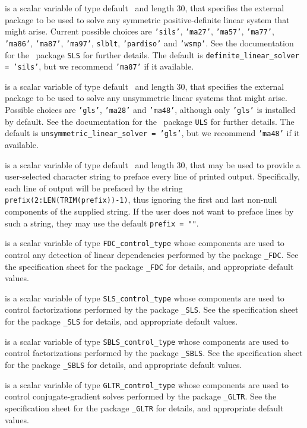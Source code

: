 \begin{description}
 is a scalar variable of type default \character\
and length 30, that specifies the external package to be used to
solve any symmetric positive-definite linear system that might arise.
Current possible
choices are {\tt 'sils'}, {\tt 'ma27'}, {\tt 'ma57'}, {\tt 'ma77'},
{\tt 'ma86'}, {\tt 'ma87'}, {\tt 'ma97'}, {\tt slblt}, {\tt 'pardiso'}
and {\tt 'wsmp'}.
See the documentation for the \galahad\ package {\tt SLS} for further details.
The default is {\tt definite\_linear\_solver = 'sils'},
but we recommend {\tt 'ma87'} if it available.

 is a scalar variable of type default
\character\
and length 30, that specifies the external package to be used to
solve any unsymmetric linear systems that might arise. Possible
choices are
{\tt 'gls'},
{\tt 'ma28'}
and
{\tt 'ma48'},
although only {\tt 'gls'} is installed by default.
See the documentation for the \galahad\ package {\tt ULS} for further details.
The default is {\tt unsymmetric\_linear\_solver = 'gls'},
but we recommend {\tt 'ma48'} if it available.

 is a scalar variable of type default \character\
and length 30, that may be used to provide a user-selected
character string to preface every line of printed output.
Specifically, each line of output will be prefaced by the string
{\tt prefix(2:LEN(TRIM(prefix))-1)},
thus ignoring the first and last non-null components of the
supplied string. If the user does not want to preface lines by such
a string, they may use the default {\tt prefix = ""}.

\itt{FDC\_control} is a scalar variable of type
{\tt FDC\_control\_type}
whose components are used to control any detection of linear dependencies
performed by the package
{\tt \libraryname\_FDC}.
See the specification sheet for the package
{\tt \libraryname\_FDC}
for details, and appropriate default values.

\itt{SLS\_control} is a scalar variable of type
{\tt SLS\_control\_type}
whose components are used to control factorizations
performed by the package
{\tt \libraryname\_SLS}.
See the specification sheet for the package
{\tt \libraryname\_SLS}
for details, and appropriate default values.

\itt{SBLS\_control} is a scalar variable of type
{\tt SBLS\_control\_type}
whose components are used to control factorizations
performed by the package
{\tt \libraryname\_SBLS}.
See the specification sheet for the package
{\tt \libraryname\_SBLS}
for details, and appropriate default values.

\itt{GLTR\_control} is a scalar variable of type
{\tt GLTR\_control\_type}
whose components are used to control conjugate-gradient solves
performed by the package
{\tt \libraryname\_GLTR}.
See the specification sheet for the package
{\tt \libraryname\_GLTR}
for details, and appropriate default values.

\end{description}
